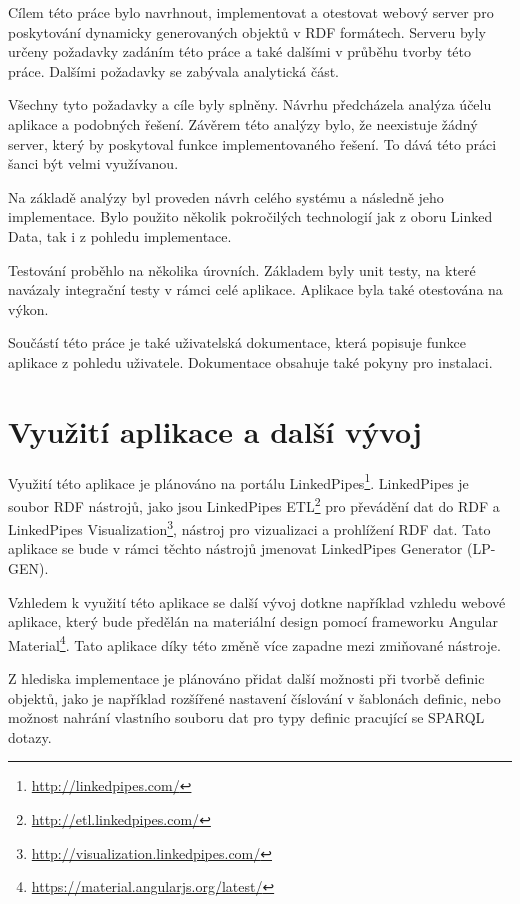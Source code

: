 \documentclass[thesis=B,czech]{FITthesis}[2012/06/26]
\begin{document}
\begin{conclusion}
Cílem této práce bylo navrhnout, implementovat a otestovat webový server pro poskytování dynamicky generovaných objektů v RDF formátech.
Serveru byly určeny požadavky zadáním této práce a také dalšími v průběhu tvorby této práce. Dalšími požadavky se zabývala analytická část.

Všechny tyto požadavky a cíle byly splněny.
Návrhu předcházela analýza účelu aplikace a podobných řešení. Závěrem této analýzy bylo, že neexistuje žádný server, který by poskytoval funkce
implementovaného řešení. To dává této práci šanci být velmi využívanou.

Na základě analýzy byl proveden návrh celého systému a následně jeho implementace. Bylo použito několik pokročilých technologií jak z oboru Linked Data,
tak i z pohledu implementace.

Testování proběhlo na několika úrovních. Základem byly unit testy, na které navázaly integrační testy v rámci celé aplikace.
Aplikace byla také otestována na výkon.

Součástí této práce je také uživatelská dokumentace, která popisuje funkce aplikace z pohledu uživatele. Dokumentace obsahuje také pokyny pro instalaci.
		
\section{Využití aplikace a další vývoj}
Využití této aplikace je plánováno na portálu LinkedPipes\footnote{\url{http://linkedpipes.com/}}.
LinkedPipes je soubor RDF nástrojů, jako jsou LinkedPipes ETL\footnote{\url{http://etl.linkedpipes.com/}} pro převádění dat do RDF
a LinkedPipes Visualization\footnote{\url{http://visualization.linkedpipes.com/}}, nástroj pro vizualizaci a prohlížení RDF dat.
Tato aplikace se bude v rámci těchto nástrojů jmenovat LinkedPipes Generator (LP-GEN).

Vzhledem k využití této aplikace se další vývoj dotkne například vzhledu webové aplikace, který bude předělán na materiální design pomocí 
frameworku Angular Material\footnote{\url{https://material.angularjs.org/latest/}}. Tato aplikace díky této změně více zapadne mezi zmiňované nástroje.

Z hlediska implementace je plánováno přidat další možnosti při tvorbě definic objektů, jako je například rozšířené 
nastavení číslování v šablonách definic, nebo možnost nahrání vlastního souboru dat pro typy definic pracující se SPARQL dotazy.



\end{conclusion}
\end{document}
